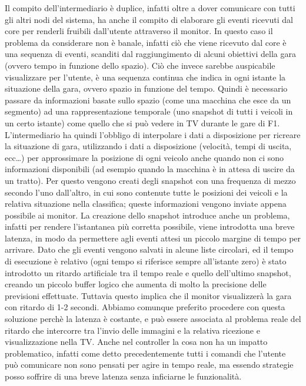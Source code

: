 Il compito dell’intermediario è duplice, infatti oltre a dover comunicare con tutti gli altri nodi del sistema, ha anche il compito di elaborare gli eventi ricevuti dal core per renderli fruibili dall’utente attraverso il monitor.
In questo caso il problema da considerare non è banale, infatti ciò che viene ricevuto dal core è una sequenza di eventi, scanditi dal raggiungimento di alcuni obiettivi della gara (ovvero tempo in funzione dello spazio). Ciò che invece sarebbe auspicabile visualizzare per l’utente, è una sequenza continua che indica in ogni istante la situazione della gara, ovvero spazio in funzione del tempo. Quindi è necessario passare da informazioni basate sullo spazio (come una macchina che esce da un segmento) ad una rappresentazione temporale (uno snapshot di tutti i veicoli in un certo istante) come quello che si può vedere in TV durante le gare di F1.
L’intermediario ha quindi l’obbligo di interpolare i dati a disposizione per ricreare la situazione di gara, utilizzando i dati a disposizione (velocità, tempi di uscita, ecc…) per approssimare la posizione di ogni veicolo anche quando non ci sono informazioni disponibili (ad esempio quando la macchina è in attesa di uscire da un tratto).
Per questo vengono creati degli snapshot con una frequenza di mezzo secondo l’uno dall’altro, in cui sono contenute tutte le posizioni dei veicoli e la relativa situazione nella classifica; queste informazioni vengono inviate appena possibile ai monitor.
La creazione dello snapshot introduce anche un problema, infatti per rendere l’istantanea più corretta possibile, viene introdotta una breve latenza, in modo da permettere agli eventi attesi un piccolo margine di tempo per arrivare. Dato che gli eventi vengono salvati in alcune liste circolari, ed il tempo di esecuzione è relativo (ogni tempo si riferisce sempre all’istante zero) è stato introdotto un ritardo artificiale tra il tempo reale e quello dell’ultimo snapshot, creando un piccolo buffer logico che aumenta di molto la precisione delle previsioni effettuate. Tuttavia questo implica che il monitor visualizzerà la gara con ritardo di 1-2 secondi. Abbiamo comunque preferito procedere con questa soluzione perchè la latenza è costante, e può essere associata al problema reale del ritardo che intercorre tra l’invio delle immagini e la relativa ricezione e visualizzazione nella TV. Anche nel controller la cosa non ha un impatto problematico, infatti come detto precedentemente tutti i comandi che l’utente può comunicare non sono pensati per agire in tempo reale, ma essendo strategie posso soffrire di una breve latenza senza inficiarne le funzionalità.

